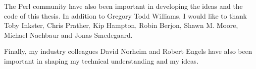 The Perl community have also been important in developing the ideas
and the code of this thesis. In addition to Gregory Todd Williams, I
would like to thank Toby Inkster, Chris Prather, Kip Hampton, Robin
Berjon, Shawn M.  Moore, Michael Nachbaur and Jonas Smedegaard.

Finally, my industry colleagues David Norheim and Robert Engels have
also been important in shaping my technical understanding and my
ideas.
